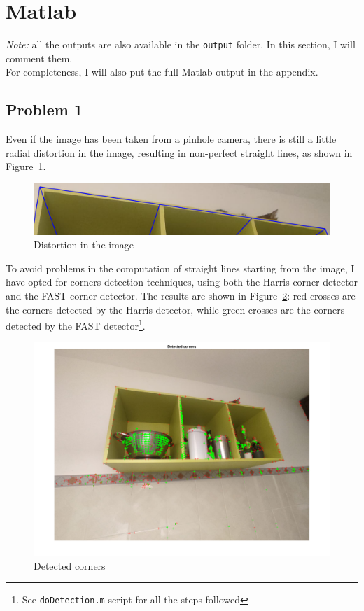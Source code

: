 \documentclass[a4paper, 11pt, oneside, openright, english]{article}
\begin{document}
\vspace{2cm}

\section{Matlab}

\textit{Note:} all the outputs are also available in the \texttt{output} folder. In this section, I will comment them.\\
For completeness, I will also put the full Matlab output in the appendix.

\subsection{Problem 1}

Even if the image has been taken from a pinhole camera, there is still a little radial distortion in the image, resulting in non-perfect straight lines, as shown in Figure~\ref{fig:distortion}.

\begin{figure}[H]
    \centering
    \includegraphics[width=1\textwidth]{output/distortion.png}
    \caption{Distortion in the image}
    \label{fig:distortion}
\end{figure}

To avoid problems in the computation of straight lines starting from the image, I have opted for corners detection techniques, using both the Harris corner detector and the FAST corner detector. The results are shown in Figure~\ref{fig:corners_detected}: red crosses are the corners detected by the Harris detector, while green crosses are the corners detected by the FAST detector\footnote{See \texttt{doDetection.m} script for all the steps followed}.

\begin{figure}[H]
    \centering
    \includegraphics[width=.75\textwidth]{output/corners_detected.png}
    \caption{Detected corners}
    \label{fig:corners_detected}
\end{figure}
\end{document}
